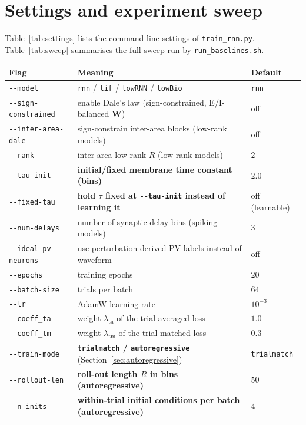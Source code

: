 \documentclass[11pt]{article}
\newcommand{\Wmat}{\mathbf{W}}
\newcommand{\code}[1]{\texttt{#1}}
\begin{document}
\section{Settings and experiment sweep}
\label{sec:settings}
Table~\ref{tab:settings} lists the command-line settings of \code{train\_rnn.py}.
Table~\ref{tab:sweep} summarises the full sweep run by \code{run\_baselines.sh}.

\begin{table}[t]
\centering
\small
\begin{tabular}{@{}lll@{}}
\toprule
Flag & Meaning & Default \\
\midrule
\code{-{}-model} & \code{rnn} / \code{lif} / \code{lowRNN} / \code{lowBio} & \code{rnn} \\
\code{-{}-sign-constrained} & enable Dale's law (sign-constrained, E/I-balanced $\Wmat$) & off \\
\code{-{}-inter-area-dale} & sign-constrain inter-area blocks (low-rank models) & off \\
\code{-{}-rank} & inter-area low-rank $R$ (low-rank models) & $2$ \\
\code{-{}-tau-init} & \textbf{initial/fixed membrane time constant (bins)} & $2.0$ \\
\code{-{}-fixed-tau} & \textbf{hold $\tau$ fixed at \code{-{}-tau-init} instead of learning it} & off (learnable) \\
\code{-{}-num-delays} & number of synaptic delay bins (spiking models) & $3$ \\
\code{-{}-ideal-pv-neurons} & use perturbation-derived PV labels instead of waveform & off \\
\code{-{}-epochs} & training epochs & $20$ \\
\code{-{}-batch-size} & trials per batch & $64$ \\
\code{-{}-lr} & AdamW learning rate & $10^{-3}$ \\
\code{-{}-coeff\_ta} & weight $\lambda_{\mathrm{ta}}$ of the trial-averaged loss & $1.0$ \\
\code{-{}-coeff\_tm} & weight $\lambda_{\mathrm{tm}}$ of the trial-matched loss & $0.3$ \\
\code{-{}-train-mode} & \textbf{\code{trialmatch} / \code{autoregressive}} (Section~\ref{sec:autoregressive}) & \code{trialmatch} \\
\code{-{}-rollout-len} & \textbf{roll-out length $R$ in bins (autoregressive)} & $50$ \\
\code{-{}-n-inits} & \textbf{within-trial initial conditions per batch (autoregressive)} & $4$ \\

\end{tabular}
\end{table}
\end{document}
